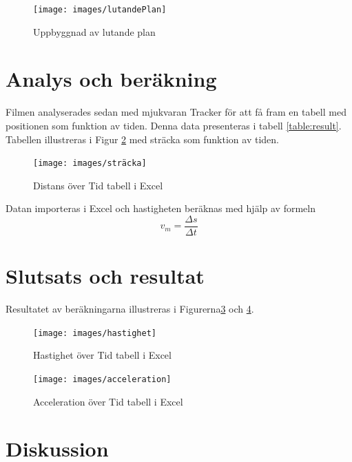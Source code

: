 \documentclass[11p, titlepage, oneside, a4paper]{article}
\begin{document}
        \begin{figure}[!h]
            \centering
            \texttt{[image: images/lutandePlan]}
            \caption{Uppbyggnad av lutande plan}
            \label{fig:lutandeplan}
        \end{figure}

	\section{Analys och beräkning}
    Filmen analyserades sedan med mjukvaran Tracker för att få fram en tabell med positionen som funktion av
    tiden. Denna data presenteras i tabell \ref{table:result}. Tabellen illustreras i Figur \ref{fig:sträcka} med sträcka
    som funktion av tiden.

    \begin{figure}[!h]
        \centering
        \texttt{[image: images/sträcka]}
        \caption{Distans över Tid tabell i Excel}
        \label{fig:sträcka}
    \end{figure}
        

    Datan importeras i Excel och hastigheten beräknas med hjälp av formeln
    \begin{equation}
        v_m = \frac{\Delta s}{\Delta t}
    \label{eq:medelhastighet}
    \end{equation}
    
    \section{Slutsats och resultat} 
        Resultatet av beräkningarna illustreras i Figurerna\ref{fig:hastighet} och \ref{fig:acceleration}.

        \begin{figure}[!h]
            \centering
            \texttt{[image: images/hastighet]}
            \caption{Hastighet över Tid tabell i Excel}
            \label{fig:hastighet}
        \end{figure}

        \begin{figure}[!h]
            \centering
            \texttt{[image: images/acceleration]}
            \caption{Acceleration över Tid tabell i Excel}
            \label{fig:acceleration}
        \end{figure}


    \section{Diskussion}
\end{document}
